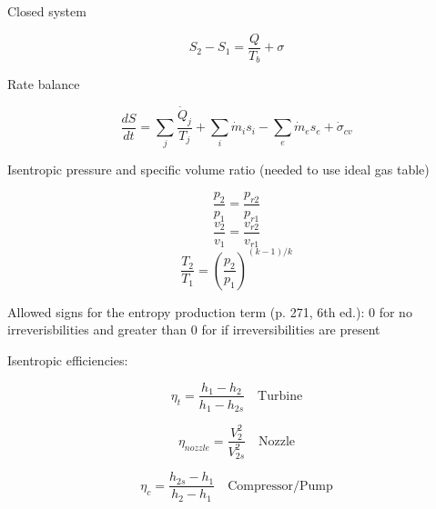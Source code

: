 \documentclass[paper=letter, fontsize=11pt]{scrartcl}
\numberwithin{equation}{section}        %
\numberwithin{figure}{section}          %
\numberwithin{table}{section}               %
\begin{document}
Closed system

\begin{equation}
    S_2-S_1 = \frac{Q}{T_b}+\sigma
\end{equation}

Rate balance

\begin{equation}
    \frac{dS}{dt} = \sum_j \frac{\dot Q_j}{T_j} + \sum_i \dot m_i s_i - \sum_e \dot m_e s_e +\dot\sigma_{cv}
\end{equation}

Isentropic pressure and specific volume ratio (needed to use ideal gas table)

\begin{equation}
    \frac{p_2}{p_1}=\frac{p_{r2}}{p_{r1}}
\end{equation}
\begin{equation}
    \frac{v_2}{v_1}=\frac{v_{r2}}{v_{r1}}
\end{equation}
\begin{equation}
    \frac{T_2}{T_1} = \left(\frac{p_2}{p_1}\right)^{(k-1)/k}
\end{equation}

Allowed signs for the entropy production term (p. 271, 6th ed.): 0 for no irreverisbilities and greater than 0 for if irreversibilities are present

Isentropic efficiencies:

\begin{equation}
    \eta_t = \frac{h_1 - h_2}{h_1 - h_{2s}}\quad\text{Turbine}
\end{equation}

\begin{equation}
    \eta_{nozzle} = \frac{V_2^2}{V_{2s}^2}\quad\text{Nozzle}
\end{equation}

\begin{equation}
    \eta_c = \frac{h_{2s} - h_1}{h_2 - h_1}\quad\text{Compressor/Pump}
\end{equation}


\end{document}
